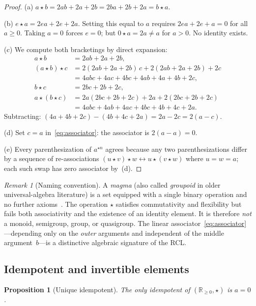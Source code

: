 \documentclass[11pt,a4paper]{article}
\theoremstyle{plain}
\newtheorem{proposition}[theorem]{Proposition}
\theoremstyle{definition}
\theoremstyle{remark}
\newtheorem{remark}[theorem]{Remark}
\newcommand{\RR}{\mathbb{R}}
\begin{document}
\begin{proof}
(a)
$a\star b=2ab+2a+2b=2ba+2b+2a=b\star a$.

(b) $e\star a=2ea+2e+2a$.  Setting this equal to $a$ requires
$2ea+2e+a=0$ for all $a\ge0$.  Taking $a=0$ forces $e=0$;
but $0\star a=2a\ne a$ for $a>0$.  No identity exists.

(c)  We compute both bracketings by direct expansion:
\begin{align*}
  a\star b &= 2ab+2a+2b, \\[2pt]
  (a\star b)\star c
    &= 2(2ab{+}2a{+}2b)\,c
       +2(2ab{+}2a{+}2b)+2c \\
    &= 4abc+4ac+4bc+4ab+4a+4b+2c, \\[6pt]
  b\star c &= 2bc+2b+2c, \\[2pt]
  a\star(b\star c)
    &= 2a(2bc{+}2b{+}2c)+2a+2(2bc{+}2b{+}2c) \\
    &= 4abc+4ab+4ac+4bc+4b+4c+2a.
\end{align*}
Subtracting:
$(4a+4b+2c)-(4b+4c+2a)=2a-2c=2(a{-}c)$.

(d)  Set $c=a$ in~\eqref{eq:associator}: the associator is
$2(a-a)=0$.

(e)  Every parenthesization of $a^{\star n}$ agrees because
any two parenthesizations differ by a sequence of re-associations
$(u\star v)\star w \leftrightarrow u\star(v\star w)$ where $u=w=a$;
each such swap has zero associator by~(d).
\end{proof}

\begin{remark}[Naming convention]\label{rem:magma}
A \emph{magma} (also called \emph{groupoid} in older universal-algebra
literature) is a set equipped with a single binary operation and no
further axioms~\cite{bourbaki1970}.
The operation $\star$ satisfies commutativity and flexibility but
fails both associativity and the existence of an identity element.
It is therefore \emph{not} a monoid, semigroup, group, or
quasigroup.  The linear associator~\eqref{eq:associator}---depending
only on the \emph{outer} arguments and independent of the middle
argument~$b$---is a distinctive algebraic signature of the RCL.
\end{remark}

\subsection{Idempotent and invertible elements}\label{ssec:idemp-inv}

\begin{proposition}[Unique idempotent]\label{prop:idempotent}
The only idempotent of $(\RR_{\ge0},\star)$ is $a=0$.
\end{proposition}
\end{document}
